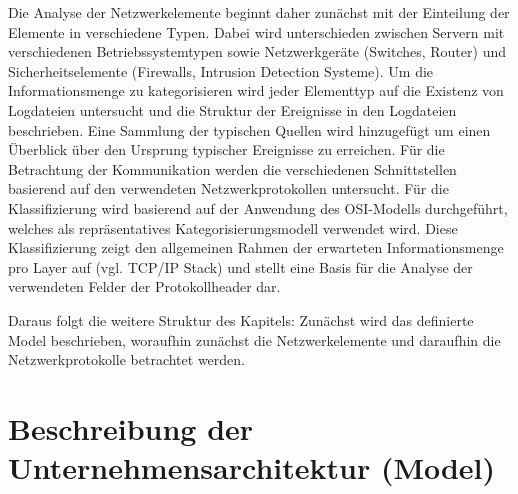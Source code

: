 Die Analyse der Netzwerkelemente beginnt daher zunächst mit der Einteilung der Elemente in verschiedene Typen. Dabei wird unterschieden zwischen Servern mit verschiedenen Betriebssystemtypen sowie Netzwerkgeräte (Switches, Router) und Sicherheitselemente (Firewalls, Intrusion Detection Systeme). Um die Informationsmenge zu kategorisieren wird jeder Elementtyp auf die Existenz von Logdateien untersucht und die Struktur der Ereignisse in den Logdateien beschrieben. Eine Sammlung der typischen Quellen wird hinzugefügt um einen Überblick über den Ursprung typischer Ereignisse zu erreichen.
Für die Betrachtung der Kommunikation werden die verschiedenen Schnittstellen basierend auf den verwendeten Netzwerkprotokollen untersucht. Für die Klassifizierung wird basierend auf der Anwendung des OSI-Modells durchgeführt, welches als repräsentatives Kategorisierungsmodell verwendet wird. Diese Klassifizierung zeigt den allgemeinen Rahmen der erwarteten Informationsmenge pro Layer auf (vgl. TCP/IP Stack) und stellt eine Basis für die Analyse der verwendeten Felder der Protokollheader dar. 

Daraus folgt die weitere Struktur des Kapitels: Zunächst wird das definierte Model beschrieben, woraufhin zunächst die Netzwerkelemente und daraufhin die Netzwerkprotokolle betrachtet werden.


\section{Beschreibung der Unternehmensarchitektur (Model)}




